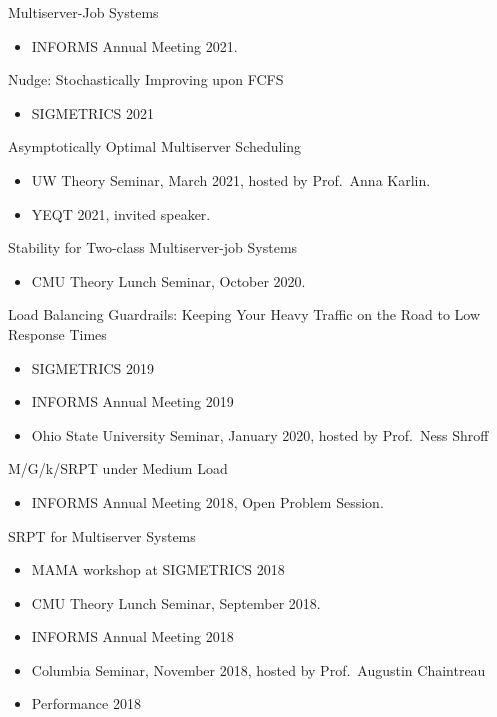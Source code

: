 \documentclass{res}
\begin{document}
\begin{resume}
    Multiserver-Job Systems
    \begin{itemize}
        \item INFORMS Annual Meeting 2021.
    \end{itemize}

    Nudge: Stochastically Improving upon FCFS
    \begin{itemize}
        \item SIGMETRICS 2021 
    \end{itemize}

    Asymptotically Optimal Multiserver Scheduling
    \begin{itemize}
        \item UW Theory Seminar, March 2021, hosted by Prof.~Anna Karlin.
        \item YEQT 2021, invited speaker.
    \end{itemize}

    Stability for Two-class Multiserver-job Systems
    \begin{itemize}
        \item CMU Theory Lunch Seminar, October 2020.
    \end{itemize}

    Load Balancing Guardrails: Keeping Your Heavy Traffic on the Road to Low Response Times
    \begin{itemize}
        \item SIGMETRICS 2019
        \item INFORMS Annual Meeting 2019
        \item Ohio State University Seminar, January 2020, hosted by Prof.~Ness Shroff
    \end{itemize}

    M/G/k/SRPT under Medium Load
    \begin{itemize}
        \item INFORMS Annual Meeting 2018, Open Problem Session.
    \end{itemize}

    SRPT for Multiserver Systems
    \begin{itemize}
        \item MAMA workshop at SIGMETRICS 2018
        \item CMU Theory Lunch Seminar, September 2018.
        \item INFORMS Annual Meeting 2018
        \item Columbia Seminar, November 2018, hosted by Prof.~Augustin Chaintreau
        \item Performance 2018
    \end{itemize}


\end{resume}
\end{document}
